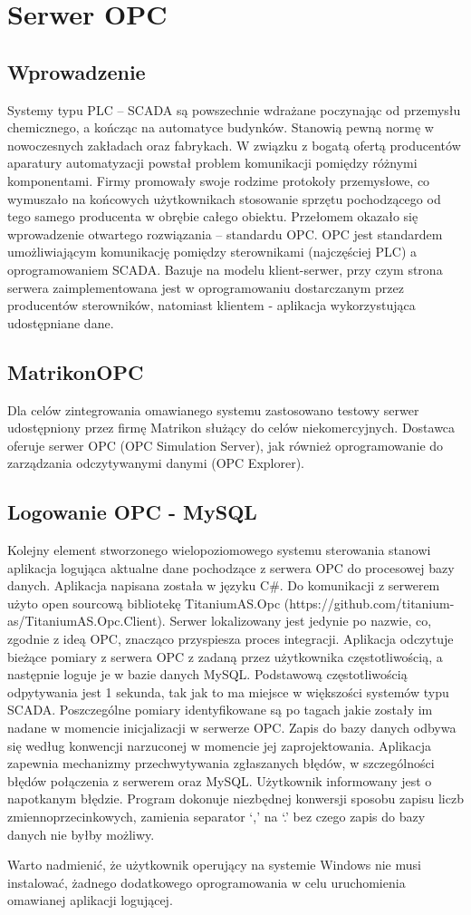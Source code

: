 \section{Serwer OPC}
\subsection{Wprowadzenie}
Systemy typu PLC – SCADA są powszechnie wdrażane poczynając od przemysłu chemicznego, a kończąc na automatyce budynków. Stanowią pewną normę w nowoczesnych zakładach oraz fabrykach. W związku z bogatą ofertą producentów aparatury automatyzacji powstał problem komunikacji pomiędzy różnymi komponentami. Firmy promowały swoje rodzime protokoły przemysłowe, co wymuszało na końcowych użytkownikach stosowanie sprzętu pochodzącego od tego samego producenta w obrębie całego obiektu. Przełomem okazało się wprowadzenie otwartego rozwiązania – standardu OPC. OPC jest standardem umożliwiającym komunikację pomiędzy sterownikami (najczęściej PLC) a oprogramowaniem SCADA. Bazuje na modelu klient-serwer, przy czym strona serwera zaimplementowana jest w oprogramowaniu dostarczanym przez producentów sterowników, natomiast klientem - aplikacja wykorzystująca udostępniane dane. 
\subsection{MatrikonOPC}
Dla celów zintegrowania omawianego systemu zastosowano testowy serwer udostępniony przez firmę Matrikon służący do celów niekomercyjnych. Dostawca oferuje serwer OPC (OPC Simulation Server), jak również oprogramowanie do zarządzania odczytywanymi danymi (OPC Explorer). 
\subsection{Logowanie OPC - MySQL}
Kolejny element stworzonego wielopoziomowego systemu sterowania stanowi aplikacja logująca aktualne dane pochodzące z serwera OPC do procesowej bazy danych. Aplikacja napisana została w języku C\#. Do komunikacji z serwerem użyto open sourcową bibliotekę TitaniumAS.Opc (https://github.com/titanium-as/TitaniumAS.Opc.Client). Serwer lokalizowany jest jedynie po nazwie, co, zgodnie z ideą OPC, znacząco przyspiesza proces integracji. Aplikacja odczytuje bieżące pomiary z serwera OPC z zadaną przez użytkownika częstotliwością, a następnie loguje je w bazie danych MySQL. Podstawową częstotliwością odpytywania jest 1 sekunda, tak jak to ma miejsce w większości systemów typu SCADA. Poszczególne pomiary identyfikowane są po tagach jakie zostały im nadane w momencie inicjalizacji w serwerze OPC. Zapis do bazy danych odbywa się według konwencji narzuconej w momencie jej zaprojektowania. Aplikacja zapewnia mechanizmy przechwytywania zgłaszanych błędów, w szczególności błędów połączenia z serwerem oraz MySQL. Użytkownik informowany jest o napotkanym błędzie. Program dokonuje niezbędnej konwersji sposobu zapisu liczb zmiennoprzecinkowych, zamienia separator ‘,’ na ‘.’ bez czego zapis do bazy danych nie byłby możliwy.
 
Warto nadmienić, że użytkownik operujący na systemie Windows nie musi instalować, żadnego dodatkowego oprogramowania w celu uruchomienia omawianej aplikacji logującej.
